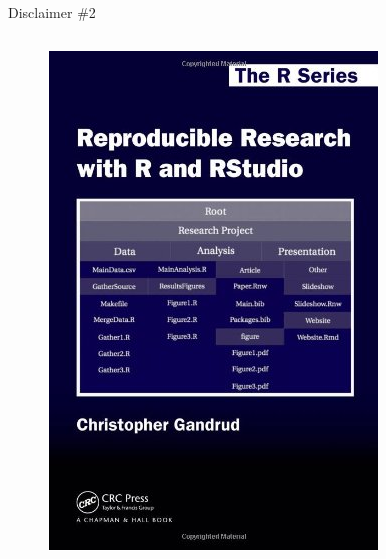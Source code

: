 \documentclass[10pt]{beamer}\usepackage[]{graphicx}\usepackage[]{color}
\begin{document}
\begin{frame}{Disclaimer \#2}
\begin{columns}[c]
\begin{figure}
\includegraphics[width=0.6\columnwidth]{chris.png}
\end{figure}
\end{columns}

\end{frame}
\end{document}
